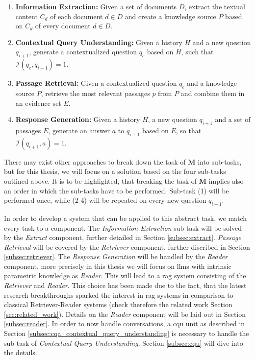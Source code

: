 \begin{enumerate}
    \item \textbf{Information Extraction:} Given a set of documents $D$, extract the textual content $C_d$ of each document $d \in D$ and create a knowledge source $P$ based on $C_d$ of every document $d \in D$.
    \item \textbf{Contextual Query Understanding:} Given a history $H$ and a new question $q_{i+1}$, generate a contextualized question $q_c$ based on $H$, such that $\mathcal{I}(q_c,q_{i+1}) = 1$.
    \item \textbf{Passage Retrieval:} Given a contextualized question $q_c$ and a knowledge source $P$, retrieve the most relevant passages $p$ from $P$ and combine them in an evidence set $E$.
    \item \textbf{Response Generation:} Given a history $H$, a new question $q_{i+1}$ and a set of passages $E$, generate an answer $a$ to $q_{i+1}$ based on $E$, so that $\mathcal{I}(q_{i+1},a) = 1$.
\end{enumerate}

There may exist other approaches to break down the task of $\mathbf{M}$ into sub-tasks, but for this thesis, we will focus on a solution based on the four sub-tasks outlined above. It is to be highlighted, that breaking the task of $\mathbf{M}$ implies also an order in which the sub-tasks have to be performed. Sub-task (1) will be performed once, while (2-4) will be repeated on every new question $q_{i+1}$.

In order to develop a system that can be applied to this abstract task, we match every task to a component. The \textit{Information Extraction} sub-task will be solved by the \textit{Extract} component, further detailed in Section \ref{subsec:extract}. \textit{Passage Retrieval} will be covered by the \textit{Retriever} component, further discribed in Section \ref{subsec:retriever}. The \textit{Response Generation} will be handled by the \textit{Reader} component, more precisely in this thesis we will focus on \gls{llm}s with intrinsic parametric knowledge as \textit{Reader}. This will lead to a \gls{rag} system consisting of the \textit{Retriever} and \textit{Reader}. This choice has been made due to the fact, that the latest research breakthroughs sparked the interest in \gls{rag} systems in comparison to classical Retriever-Reader systems (check therefore the related work Section \ref{sec:related_work}). Details on the \textit{Reader} component will be laid out in Section \ref{subsec:reader}. In order to now handle conversations, a \gls{cqu} unit as described in Section \ref{subsec:cqa_contextual_query_understanding} is necessary to handle the sub-task of \textit{Contextual Query Understanding}. Section \ref{subsec:cqu} will dive into the details.

